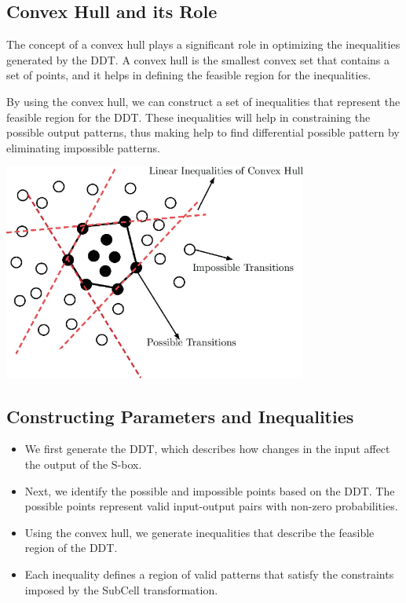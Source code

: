 \subsection*{Convex Hull and its Role}
The concept of a convex hull plays a significant role in optimizing the
inequalities generated by the DDT. A convex hull is the smallest convex set that
contains a set of points, and it helps in defining the feasible region for the
inequalities.

By using the convex hull, we can construct a set of inequalities that represent
the feasible region for the DDT. These inequalities will help in constraining
the possible output patterns, thus making help to find differential possible pattern by
eliminating impossible patterns.

\begin{center}
    \includegraphics[width=10cm]{./images/convex_hull.png}
\end{center}

\subsection*{Constructing Parameters and Inequalities}
\begin{itemize}
    \item We first generate the DDT, which describes how changes in the input affect the output of the S-box.
    \item Next, we identify the possible and impossible points based on the DDT.
          The possible points represent valid input-output pairs with non-zero
          probabilities.
    \item Using the convex hull, we generate inequalities that describe the
          feasible region of the DDT.
    \item Each inequality defines a region of valid patterns that satisfy the
          constraints imposed by the SubCell transformation.
\end{itemize}

